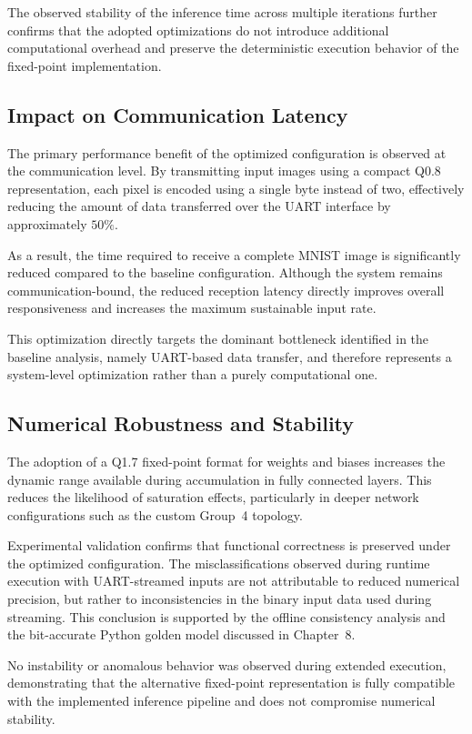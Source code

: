 The observed stability of the inference time across multiple iterations further
confirms that the adopted optimizations do not introduce additional computational
overhead and preserve the deterministic execution behavior of the fixed-point
implementation.

\subsection{Impact on Communication Latency}

The primary performance benefit of the optimized configuration is observed at the
communication level.
By transmitting input images using a compact Q0.8 representation, each pixel is
encoded using a single byte instead of two, effectively reducing the amount of data
transferred over the UART interface by approximately $50\%$.

As a result, the time required to receive a complete MNIST image is significantly
reduced compared to the baseline configuration.
Although the system remains communication-bound, the reduced reception latency
directly improves overall responsiveness and increases the maximum sustainable
input rate.

This optimization directly targets the dominant bottleneck identified in the
baseline analysis, namely UART-based data transfer, and therefore represents a
system-level optimization rather than a purely computational one.

\subsection{Numerical Robustness and Stability}

The adoption of a Q1.7 fixed-point format for weights and biases increases the
dynamic range available during accumulation in fully connected layers.
This reduces the likelihood of saturation effects, particularly in deeper network
configurations such as the custom Group~4 topology.

Experimental validation confirms that functional correctness is preserved under
the optimized configuration.
The misclassifications observed during runtime execution with UART-streamed
inputs are not attributable to reduced numerical precision, but rather to
inconsistencies in the binary input data used during streaming.
This conclusion is supported by the offline consistency analysis and the
bit-accurate Python golden model discussed in Chapter~8.

No instability or anomalous behavior was observed during extended execution,
demonstrating that the alternative fixed-point representation is fully compatible
with the implemented inference pipeline and does not compromise numerical
stability.

